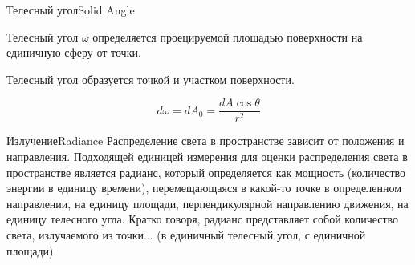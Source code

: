 \documentclass{beamer}
\begin{document}
	\begin{frame}{Телесный угол}{Solid Angle}
		
		Телесный угол $\omega$ определяется проецируемой площадью поверхности на единичную сферу от точки.

		Телесный угол образуется точкой и участком поверхности.

		\[
			d \omega = d A_0 = \frac{d A \cos \theta}{ r^2}
		\]

	\end{frame}



	\begin{frame}{Излучение}{Radiance}
		Распределение света в пространстве зависит от положения и направления. Подходящей единицей измерения для оценки распределения света в пространстве является радианс, который определяется как мощность (количество энергии в единицу времени), перемещающаяся в какой-то точке в определенном направлении, на единицу площади, перпендикулярной направлению движения, на единицу телесного угла. Кратко говоря, радианс представляет собой количество света, излучаемого из точки... (в единичный телесный угол, с единичной площади).



	\end{frame}
\end{document}
